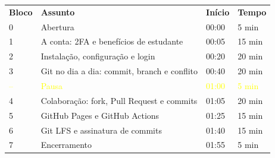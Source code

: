 \begin{frame}{}
  \vspace{0.3em}
  \footnotesize
  \begin{tabular}{@{}p{0.9cm}p{6cm}p{1.3cm}p{1.2cm}@{}}
    \textcolor{lightpurple}{\textbf{Bloco}} & \textcolor{lightpurple}{\textbf{Assunto}} & \textcolor{lightpurple}{\textbf{Início}} & \textcolor{lightpurple}{\textbf{Tempo}} \\[.3em]
    0 & Abertura                                     & 00:00 & 5 min  \\
    1 & A conta: 2FA e benefícios de estudante       & 00:05 & 15 min \\
    2 & Instalação, configuração e login             & 00:20 & 20 min \\
    3 & Git no dia a dia: commit, branch e conflito  & 00:40 & 20 min \\
    \textcolor{yellow}{--} & \textcolor{yellow}{Pausa}  & \textcolor{yellow}{01:00} & \textcolor{yellow}{5 min} \\
    4 & Colaboração: fork, Pull Request e commits    & 01:05 & 20 min \\
    5 & GitHub Pages e GitHub Actions                & 01:25 & 15 min \\
    6 & Git LFS e assinatura de commits              & 01:40 & 15 min \\
    7 & Encerramento                                 & 01:55 & 5 min  \\
  \end{tabular}

\end{frame}



